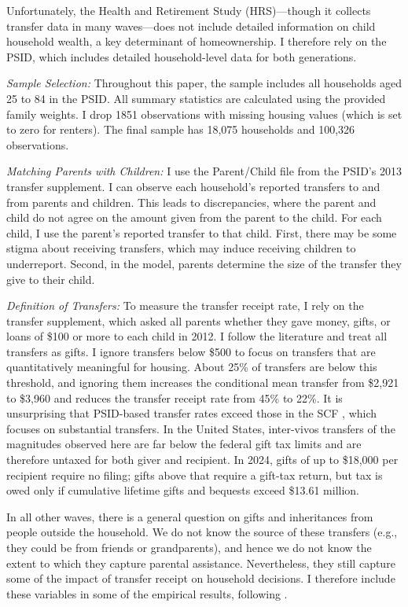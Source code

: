 \documentclass[12pt]{article}
\begin{document}
Unfortunately, the Health and Retirement Study (HRS)---though it collects transfer data in many waves---does not include detailed information on child household wealth, a key determinant of homeownership. I therefore rely on the PSID, which includes detailed household-level data for both generations.

\textit{Sample Selection:} Throughout this paper, the sample includes all households aged 25 to 84 in the PSID. All summary statistics are calculated using the provided family weights. I drop 1851 observations with missing housing values (which is set to zero for renters). The final sample has 18,075 households and 100,326 observations.

\textit{Matching Parents with Children:} I use the Parent/Child file from the PSID's 2013 transfer supplement. I can observe each household's reported transfers to and from parents and children. This leads to discrepancies, where the parent and child do not agree on the amount given from the parent to the child. For each child, I use the parent's reported transfer to that child. First, there may be some stigma about receiving transfers, which may induce receiving children to underreport. Second, in the model, parents determine the size of the transfer they give to their child. 

\textit{Definition of Transfers:} To measure the transfer receipt rate, I rely on the transfer supplement, which asked all parents whether they gave money, gifts, or loans of \$100 or more to each child in 2012. I follow the literature \citep[e.g.,][]{mcgarry2016dynamic} and treat all transfers as gifts. I ignore transfers below \$500 to focus on transfers that are quantitatively meaningful for housing. About 25\% of transfers are below this threshold, and ignoring them increases the conditional mean transfer from \$2,921 to \$3,960 and reduces the transfer receipt rate from 45\% to 22\%. It is unsurprising that PSID-based transfer rates exceed those in the SCF \citep[e.g.,][]{feiveson2019lifecycle,sabelhaus2024household}, which focuses on substantial transfers. In the United States, inter-vivos transfers of the magnitudes observed here are far below the federal gift tax limits and are therefore untaxed for both giver and recipient. In 2024, gifts of up to \$18{,}000 per recipient require no filing; gifts above that require a gift-tax return, but tax is owed only if cumulative lifetime gifts and bequests exceed \$13.61 million.

In all other waves, there is a general question on gifts and inheritances from people outside the household. We do not know the source of these transfers (e.g., they could be from friends or grandparents), and hence we do not know the extent to which they capture parental assistance. Nevertheless, they still capture some of the impact of transfer receipt on household decisions. I therefore include these variables in some of the empirical results, following \citet{Lee2018}.
\end{document}
